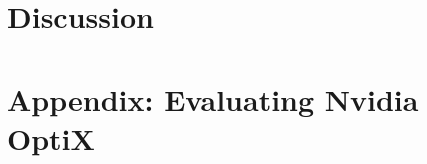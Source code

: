 \documentclass[letterpaper,11pt]{report}
\def\optix{Nvidia\textsuperscript{\textregistered} OptiX\texttrademark\ }
\begin{document}
\chapter{Discussion}

\chapter{Appendix: Evaluating \optix}



%

%
%


\end{document}
